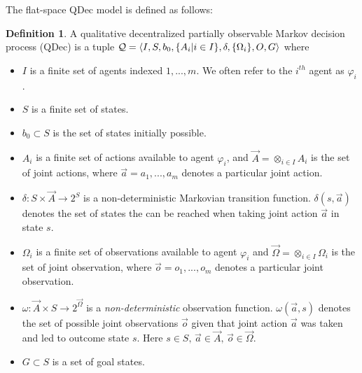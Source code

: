 \documentclass[letterpaper]{article} %
\theoremstyle{definition}
\newtheorem{definition}{Definition}[section]
\begin{document}
The flat-space QDec model is defined as follows:
\begin{definition} A qualitative decentralized partially observable Markov decision process
(QDec) is a tuple ${\cal Q} = \langle  I, S, b_0,\{A_i | i\in I\}, \delta, \{\Omega_i\}, O, G\rangle$
where
\begin{itemize}
\item $I$ is a finite set of agents indexed $1,...,m$. We often refer to the $i^{th}$ agent as $\varphi_i$.

\item $S$ is a finite set of states.

\item$b_0 \subset S$ is the set of states initially possible.

\item  $A_i$ is a finite set of actions available to agent $\varphi_i$, 
and $\vec{A} = \otimes_{i \in I} A_i$ is the set of joint actions,
where
$\vec{a} = {a_1,...,a_m}$ denotes a particular joint action.

\item $\delta: S \times \vec{A} \rightarrow 2^S$ is a non-deterministic Markovian transition function. $\delta(s, \vec{a})
$ denotes the set of states the can be reached when taking joint action $\vec{a}$ in state $s$.

\item $\Omega_i$ is a finite set of observations available to agent $\varphi_i$ and
$\vec{\Omega} = \otimes_{i \in I} \Omega_i$ is the set of joint
observation, where $\vec{o} = {o_1,...,o_m}$ denotes a particular joint
observation.

\item $\omega : \vec{A} \times S \rightarrow 2^{\vec{\Omega}}$ is a {\em non-deterministic\/} observation function. $\omega(\vec{a}, s)$
denotes the set of possible joint observations $\vec{o}$ given that
joint action $\vec{a}$ was taken and led to outcome state $s$. Here $s \in S,\, \vec{a}
\in \vec{A},\, \vec{o} \in \vec{\Omega}$.

\item $G \subset S$ is a set of goal states.

\end{itemize}
\label{11_def:DEC-POMDP}
\end{definition}
\end{document}

